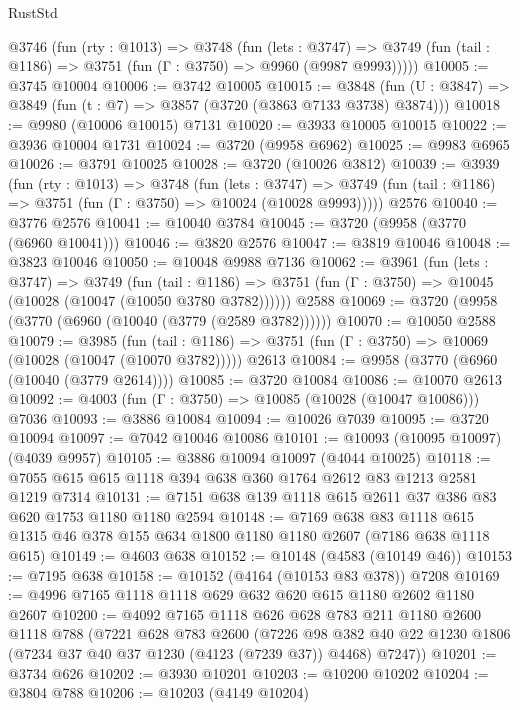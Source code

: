 \begin{lexlean}{RustStd}
\begin{coremodule}
  @3746
    (fun (rty : @1013) =>
    @3748
      (fun (lets : @3747) =>
      @3749 (fun (tail : @1186) => @3751 (fun (Γ : @3750) => @9960 (@9987 @9993)))))
@10005 := @3745 @10004
@10006 := @3742 @10005
@10015 := @3848 (fun (U : @3847) => @3849 (fun (t : @7) => @3857 (@3720 (@3863 @7133 @3738) @3874)))
@10018 := @9980 (@10006 @10015) @7131
@10020 := @3933 @10005 @10015
@10022 := @3936 @10004 @1731
@10024 := @3720 (@9958 @6962)
@10025 := @9983 @6965
@10026 := @3791 @10025
@10028 := @3720 (@10026 @3812)
@10039 := @3939
    (fun (rty : @1013) =>
    @3748
      (fun (lets : @3747) =>
      @3749 (fun (tail : @1186) => @3751 (fun (Γ : @3750) => @10024 (@10028 @9993)))))
    @2576
@10040 := @3776 @2576
@10041 := @10040 @3784
@10045 := @3720 (@9958 (@3770 (@6960 @10041)))
@10046 := @3820 @2576
@10047 := @3819 @10046
@10048 := @3823 @10046
@10050 := @10048 @9988 @7136
@10062 := @3961
    (fun (lets : @3747) =>
    @3749
      (fun (tail : @1186) =>
      @3751 (fun (Γ : @3750) => @10045 (@10028 (@10047 (@10050 @3780 @3782))))))
    @2588
@10069 := @3720 (@9958 (@3770 (@6960 (@10040 (@3779 (@2589 @3782))))))
@10070 := @10050 @2588
@10079 := @3985
    (fun (tail : @1186) => @3751 (fun (Γ : @3750) => @10069 (@10028 (@10047 (@10070 @3782)))))
    @2613
@10084 := @9958 (@3770 (@6960 (@10040 (@3779 @2614))))
@10085 := @3720 @10084
@10086 := @10070 @2613
@10092 := @4003 (fun (Γ : @3750) => @10085 (@10028 (@10047 @10086))) @7036
@10093 := @3886 @10084
@10094 := @10026 @7039
@10095 := @3720 @10094
@10097 := @7042 @10046 @10086
@10101 := @10093 (@10095 @10097) (@4039 @9957)
@10105 := @3886 @10094 @10097 (@4044 @10025)
@10118 := @7055 @615 @615 @1118 @394 @638 @360 @1764 @2612 @83 @1213 @2581 @1219 @7314
@10131 := @7151 @638 @139 @1118 @615 @2611 @37 @386 @83 @620 @1753 @1180 @1180 @2594
@10148 := @7169
    @638
    @83
    @1118
    @615
    @1315
    @46
    @378
    @155
    @634
    @1800
    @1180
    @1180
    @2607
    (@7186 @638 @1118 @615)
@10149 := @4603 @638
@10152 := @10148 (@4583 (@10149 @46))
@10153 := @7195 @638
@10158 := @10152 (@4164 (@10153 @83 @378)) @7208
@10169 := @4996 @7165 @1118 @1118 @629 @632 @620 @615 @1180 @2602 @1180 @2607
@10200 := @4092
    @7165
    @1118
    @626
    @628
    @783
    @211
    @1180
    @2600
    @1118
    @788
    (@7221
      @628
      @783
      @2600
      (@7226
        @98
        @382
        @40
        @22
        @1230
        @1806
        (@7234 @37 @40 @37 @1230 (@4123 (@7239 @37)) @4468)
        @7247))
@10201 := @3734 @626
@10202 := @3930 @10201
@10203 := @10200 @10202
@10204 := @3804 @788
@10206 := @10203 (@4149 @10204)

\end{coremodule}
\end{lexlean}
